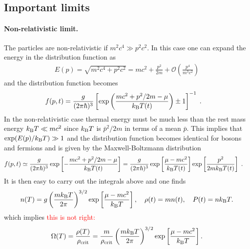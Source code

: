 \documentclass[a4paper]{article}
\newcommand{\fixme}[1]{\textcolor{red}{#1}}
\begin{document}
\subsection{Important limits}
\paragraph{Non-relativistic limit.} The particles are non-relativistic if $m^2c^4\gg p^2 c^2$. In this case one can expand the energy in the distribution function as
\begin{align}
  E(p) = \sqrt{m^2c^4+p^2c^2} = mc^2 + \frac{p^2}{2m} + \mathcal{O}\left(\frac{p^4}{m^3c^2}\right)
\end{align}
 and the distribution function becomes
\begin{align}
f(p,t) & = \frac{g}{(2\pi \hbar)^3}\left[\exp\left(\frac{mc^2+p^2/2m-\mu}{k_{\rm B}T(t)}\right)\pm 1\right]^{-1} \;.
\end{align}
In the non-relativistic case thermal energy must be much less than the rest mass energy $k_{\rm B}T \ll mc^2$ since $k_{\rm B}T$ is $\bar{p}^2/2m$ in terms of a mean $\bar p$.  This implies that $\exp(E(p)/{k_{\rm B}T})\gg 1$ and the distribution function becomes identical for bosons and fermions and is given by the Maxwell-Boltzmann distribution
\begin{align}
f(p,t) & \simeq \frac{g}{(2\pi \hbar)^3}\exp\left[-\frac{mc^2+p^2/2m-\mu}{k_{\rm B}T(t)}\right] =  \frac{g}{(2\pi \hbar)^3}\exp\left[\frac{\mu-mc^2}{k_{\rm B}T(t)}\right]\exp\left[\frac{p^2}{2mk_{\rm B}T(t)}\right]\;.
\end{align}
It is then easy to carry out the integrals above and one finds
\begin{equation}
n(T) = g\left(\frac{mk_{\rm B}T}{2\pi}\right)^{3/2}\exp\left[\frac{\mu-mc^2}{k_{\rm B}T}\right],\quad\rho(t)= mn(t),\quad P(t) = nk_{\rm B}T.
\end{equation}
which implies \fixme{this is not right:}
\begin{align}
  \Omega(T) = \frac{\rho(T)}{\rho_{\rm crit}} = \frac{m}{\rho_{\rm crit}}\left(\frac{mk_{\rm B}T}{2\pi}\right)^{3/2}\exp\left[\frac{\mu-mc^2}{k_{\rm B}T}\right].
\end{align}
\end{document}
